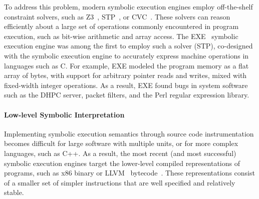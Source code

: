 To address this problem, modern symbolic execution engines employ off-the-shelf constraint solvers, such as Z3~\cite{Z3}, STP~\cite{stp}, or CVC~\cite{cvc}.  These solvers can reason efficiently about a large set of operations commonly encountered in program execution, such as bit-wise arithmetic and array access.
%
The EXE~\cite{exe} symbolic execution engine was among the first to employ such a solver (STP), co-designed with the symbolic execution engine to accurately express machine operations in languages such as C.
%
For example, EXE modeled the program memory as a flat array of bytes, with support for arbitrary pointer reads and writes, mixed with fixed-width integer operations.
%
As a result, EXE found bugs in system software such as the  DHPC server, packet filters, and the  Perl regular expression library.

\paragraph{Low-level Symbolic Interpretation}

Implementing symbolic execution semantics through source code instrumentation becomes difficult for large software with multiple units, or for more complex languages, such as C++.
%
As a result, the most recent (and most successful) symbolic execution engines target the lower-level compiled representations of programs, such as x86 binary or LLVM~\cite{llvm} bytecode~\cite{godefroid:fuzz,klee,bitBlaze,s2eSystem,mayhem}.  These representations consist of a smaller set of simpler instructions that are well specified and relatively stable.



